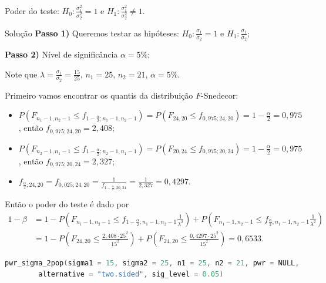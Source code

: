 \documentclass[9pt]{beamer}
\begin{document}
\begin{frame}[fragile]{Poder do teste: $H_0:\frac{\sigma_1^2}{\sigma_2^2} = 1$ e $H_1:\frac{\sigma_1^2}{\sigma_2^2} \neq 1$.}

\tiny

\begin{block}{Solução}
	\textbf{Passo 1)} Queremos testar as hipóteses: $H_0: \frac{\sigma_1}{\sigma_2} = 1$ e $H_1: \frac{\sigma_1}{\sigma_2}$;
	
	\textbf{Passo 2)} Nível de significância $\alpha=5\%$;
	
	Note que $\lambda = \frac{\sigma_1}{\sigma_2} = \frac{15}{25}$, $n_1=25$, $n_2=21$, $\alpha=5\%$.
	
	Primeiro vamos encontrar os quantis da distribuição $F$-Snedecor:
	\begin{itemize}
		\item $P\left(F_{n_1-1, n_2-1} \leq f_{1-\frac{\alpha}{2}; n_1-1, n_2-1} \right) = P\left(F_{24, 20} \leq f_{0,975; 24, 20} \right) =1- \frac{\alpha}{2} = 0,975$, então $f_{0,975; 24, 20} = 2,408$;
		\item $P\left(F_{n_2-1, n_1-1} \leq f_{1-\frac{\alpha}{2}; n_2-1, n_1-1} \right) = P\left(F_{20, 24} \leq f_{0,975; 20, 24} \right) =1- \frac{\alpha}{2} = 0,975$, então $f_{0,975; 20, 24} = 2,327$;
		\item $f_{\frac{\alpha}{2}; 24, 20} = f_{0,025; 24, 20} =  \frac{1}{f_{1-\frac{\alpha}{2};20, 24}} = \frac{1}{2,327}=0,4297$.
	\end{itemize}

	Então o poder do teste é dado por
	\begin{align*}
		1-\beta &= 1 - P\left( F_{n_1-1, n_2-1} \leq f_{1-\frac{\alpha}{2};n_1-1, n_2-1} \frac{1}{\lambda^2} \right) + P\left( F_{n_1-1, n_2-1} \leq f_{\frac{\alpha}{2};n_1-1, n_2-1} \frac{1}{\lambda^2} \right)\\
		&= 1 - P\left( F_{24, 20} \leq \frac{2,408 \cdot 25^2}{15^2} \right) + P\left( F_{24, 20} \leq \frac{0,4297 \cdot 25^2}{15^2} \right) = 0,6533.
	\end{align*}
\end{block}

\begin{lstlisting}[language = C, caption = Código no R.]
pwr_sigma_2pop(sigma1 = 15, sigma2 = 25, n1 = 25, n2 = 21, pwr = NULL,
		alternative = "two.sided", sig_level = 0.05)
\end{lstlisting}

\normalsize
\end{frame}
\end{document}
